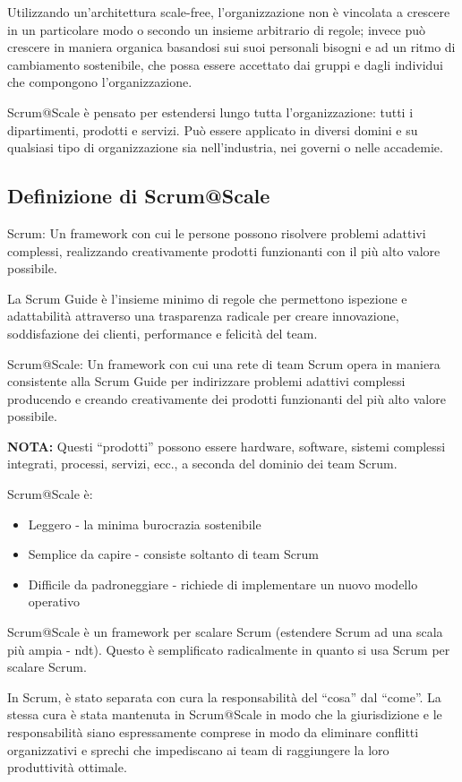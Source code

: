 \documentclass[12pt,a4paper,parskip=full]{scrartcl}
\begin{document}
Utilizzando un'architettura scale-free, l'organizzazione non è 
vincolata a crescere in un particolare modo o secondo un insieme arbitrario di
regole; invece può crescere in maniera organica basandosi sui suoi personali
bisogni e ad un ritmo di cambiamento sostenibile, che possa essere 
accettato dai gruppi e dagli individui che compongono l'organizzazione.

Scrum@Scale è pensato per estendersi lungo tutta l'organizzazione: tutti
i dipartimenti, prodotti e servizi. Può essere applicato in diversi domini
e su qualsiasi tipo di organizzazione sia nell'industria, nei governi o nelle accademie.

\subsection{Definizione di Scrum@Scale}
Scrum: Un framework con cui le persone possono risolvere problemi adattivi complessi,
realizzando creativamente prodotti funzionanti con il più alto valore possibile.

La Scrum Guide è l'insieme minimo di regole che permettono ispezione e adattabilità
attraverso una trasparenza radicale per creare innovazione, soddisfazione dei clienti,
performance e felicità del team.

Scrum@Scale: Un framework con cui una rete di team Scrum opera in maniera consistente
alla Scrum Guide per indirizzare problemi adattivi complessi producendo e creando creativamente dei prodotti funzionanti del più alto valore possibile.

\textbf{NOTA:} Questi ``prodotti'' possono essere hardware, software, sistemi complessi integrati, processi, servizi, ecc., a seconda del dominio dei team Scrum.

Scrum@Scale è:
\begin{itemize}
\item Leggero - la minima burocrazia sostenibile
\item Semplice da capire - consiste soltanto di team Scrum
\item Difficile da padroneggiare - richiede di implementare un nuovo modello operativo
\end{itemize}

Scrum@Scale è un framework per scalare Scrum (estendere Scrum ad una scala più ampia - ndt). Questo è semplificato radicalmente in quanto si usa Scrum per scalare Scrum.

In Scrum, è stato separata con cura la responsabilità del ``cosa'' dal ``come''.
La stessa cura è stata mantenuta in Scrum@Scale in modo che la giurisdizione e le responsabilità siano espressamente comprese in modo da eliminare conflitti organizzativi e sprechi che impediscano ai team di raggiungere la loro produttività ottimale.
\end{document}
